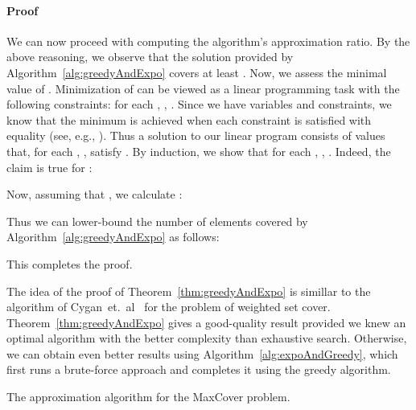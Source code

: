 \documentclass[11pt]{article}
\newenvironment{proof}{\paragraph{Proof}}{\hfill\medskip}
\begin{document}
\begin{proof}
  We can now proceed with computing the algorithm's approximation
  ratio.  By the above reasoning, we observe that the solution
  provided by Algorithm~\ref{alg:greedyAndExpo} covers at least . Now, we assess
  the minimal value of . Minimization of
   can be viewed as a linear programming task with
  the following constraints: for each , , .  Since we have 
  variables and  constraints, we know that the minimum is achieved
  when each constraint is satisfied with equality (see, e.g.,
  \cite{Vazirani:2001:AA:500776}). Thus a solution to our linear
  program consists of values  that,
  for each , , satisfy . By induction,
  we show that for each , , . Indeed, the claim
  is true for :
  
  Now, assuming that , we calculate
  :
  

  Thus we can lower-bound the number of elements covered by
  Algorithm~\ref{alg:greedyAndExpo} as follows:
  
  This completes the proof.~
\end{proof}

The idea of the proof of Theorem~\ref{thm:greedyAndExpo} is simillar
to the algorithm of Cygan~et.~al~\cite{journals/ipl/CyganKW09} for the
problem of weighted set cover. Theorem~\ref{thm:greedyAndExpo} gives a
good-quality result provided we knew an optimal algorithm with the
better complexity than exhaustive search.
Otherwise, we can obtain even better results using
Algorithm~\ref{alg:expoAndGreedy}, which first runs a brute-force
approach and completes it using the greedy algorithm.

\begin{algorithm}[t]
   \small
   \SetAlCapFnt{\small}
   \;
   \;
   \Return{}
   \caption{\small The approximation algorithm for the MaxCover problem.}
   \label{alg:expoAndGreedy}
\end{algorithm}
\end{document}
